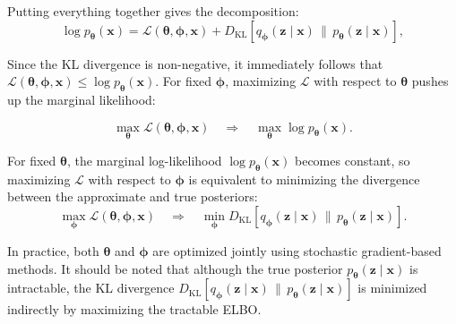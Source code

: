 \documentclass[10pt,twocolumn,article]{memoir}
\begin{document}
Putting everything together gives the decomposition:
\begin{equation}
    \log p_{\boldsymbol{\theta}}(\mathbf{x})
    = \mathcal{L}(\boldsymbol{\theta}, \boldsymbol{\phi}, \mathbf{x})
    + D_{\mathrm{KL}} \left[ q_{\boldsymbol{\phi}}(\mathbf{z} \mid \mathbf{x}) \,\|\, p_{\boldsymbol{\theta}}(\mathbf{z} \mid \mathbf{x}) \right],
\end{equation}

Since the KL divergence is non-negative, it immediately follows that $\mathcal{L}(\boldsymbol{\theta}, \boldsymbol{\phi}, \mathbf{x}) \leq \log p_{\boldsymbol{\theta}}(\mathbf{x})$. For fixed $\boldsymbol{\phi}$, maximizing $\mathcal{L}$ with respect to $\boldsymbol{\theta}$ pushes up the marginal likelihood:

\begin{equation}
    \max_{\boldsymbol{\theta}} \mathcal{L}(\boldsymbol{\theta}, \boldsymbol{\phi}, \mathbf{x}) \quad \Longrightarrow \quad \max_{\boldsymbol{\theta}} \log p_{\boldsymbol{\theta}}(\mathbf{x}).
\end{equation}

For fixed $\boldsymbol{\theta}$, the marginal log-likelihood $\log p_{\boldsymbol{\theta}}(\mathbf{x})$ becomes constant, so maximizing $\mathcal{L}$ with respect to $\boldsymbol{\phi}$ is equivalent to minimizing the divergence between the approximate and true posteriors:
\begin{equation}
    \max_{\boldsymbol{\phi}} \mathcal{L}(\boldsymbol{\theta}, \boldsymbol{\phi}, \mathbf{x}) \quad \Longrightarrow \quad \min_{\boldsymbol{\phi}} D_{\mathrm{KL}}[q_{\boldsymbol{\phi}}(\mathbf{z} \mid \mathbf{x}) \,\|\, p_{\boldsymbol{\theta}}(\mathbf{z} \mid \mathbf{x})].
\end{equation}

In practice, both $\boldsymbol{\theta}$ and $\boldsymbol{\phi}$ are optimized jointly using stochastic gradient-based methods. It should be noted that although the true posterior $p_{\boldsymbol{\theta}}(\mathbf{z} \mid \mathbf{x})$ is intractable, the KL divergence $D_{\mathrm{KL}}[q_{\boldsymbol{\phi}}(\mathbf{z} \mid \mathbf{x}) \,\|\, p_{\boldsymbol{\theta}}(\mathbf{z} \mid \mathbf{x})]$ is minimized indirectly by maximizing the tractable ELBO.
\end{document}
